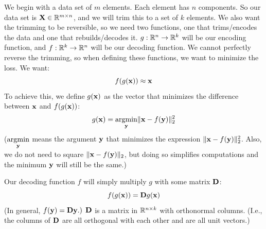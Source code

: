 We begin with a data set of $m$ elements.  Each element has $n$ components.  So our data set is $\MX \in \R^{m \times n}$, and we will trim this to a set of $k$ elements.  We also want the trimming to be reversible, so we need two functions, one that trims/encodes the data and one that rebuilds/decodes it.  $g: \R^n \to \R^k$ will be our encoding function, and $f: \R^k \to \R^n$ will be our decoding function.
We cannot perfectly reverse the trimming, so when defining these functions, we want to minimize the loss.  We want:
$$f(g(\vx)) \approx \vx$$
To achieve this, we define $g(\vx)$ as the vector that minimizes the difference between $\vx$ and $f(g(\vx))$:
$$g(\vx) = \underset{\vy}{\argmin} \|\vx - f(\vy)\|^2_2$$
($\underset{\vy}{\argmin}$ means the argument $\vy$ that minimizes the expression $\|\vx - f(\vy)\|^2_2$.  Also, we do not need to square $\|\vx - f(\vy)\|_2$, but doing so simplifies computations and the minimum $\vy$ will still be the same.)

Our decoding function $f$ will simply multiply $g$ with some matrix $\MD$:
$$f(g(\vx)) = \MD g(\vx)$$
(In general, $f(\vy) = \MD \vy.)$  $\MD$ is a matrix in $\R^{n \times k}$ with orthonormal columns.  (I.e., the columns of $\MD$ are all orthogonal with each other and are all unit vectors.)

